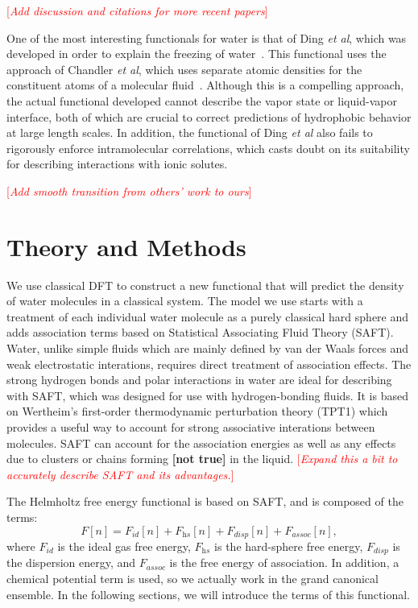 \documentclass[letterpaper,twocolumn,amsmath,amssymb,prb]{revtex4-1}
\newcommand{\red}[1]{{\bf \color{red} #1}}
\newcommand{\fixme}[1]{\red{[#1]}}
\newcommand{\needsworknow}[1]{\textcolor{red}{[\emph{#1}]}}
\begin{document}
\needsworknow{Add discussion and citations for more recent papers}

One of the most interesting functionals for water is that of Ding \emph{et
al}, which was developed in order to explain the freezing of
water~\cite{ding1987}.  This functional uses the approach of Chandler
\emph{et al}, which uses separate atomic densities for the constituent
atoms of a molecular fluid~\cite{chandler1986a, chandler1986b}.  Although
this is a compelling approach, the actual functional developed cannot
describe the vapor state or liquid-vapor interface, both of which are
crucial to correct predictions of hydrophobic behavior at large length
scales.  In addition, the functional of Ding \emph{et al} also fails to
rigorously enforce intramolecular correlations, which casts doubt on its
suitability for describing interactions with ionic solutes.

\needsworknow{Add smooth transition from others' work to ours}

\section{Theory and Methods}
We use classical DFT to construct a new functional that will predict
the density of water molecules in a classical system.  The model we use
starts with a treatment of each individual water molecule as a purely
classical hard sphere and adds association terms based on Statistical 
Associating Fluid Theory (SAFT). Water, unlike simple
fluids which are mainly defined by van der Waals forces and weak electrostatic
interations, requires direct treatment of association effects. The strong 
hydrogen bonds and polar
interactions in water are ideal for describing with SAFT, which was designed for
use with hydrogen-bonding fluids. It is based on Wertheim's first-order
thermodynamic perturbation theory (TPT1)
\cite{wertheim1984fluidsI,wertheim1984fluidsII,wertheim1986fluidsIII,
wertheim1986fluidsIV} which provides a useful way to account for strong
associative interations between molecules. SAFT can account for the association energies
as well as any effects due to clusters or chains forming \fixme{not true}
in the liquid\cite{muller2001molecular}.  \needsworknow{Expand this a
  bit to accurately describe SAFT and its advantages.}

The Helmholtz free energy functional is based on SAFT,
and is composed of the terms:
\begin{equation}
  F[n] = F_\textit{id}[n] + F_\textit{hs}[n]  +
F_\textit{disp}[n]+ F_\textit{assoc}[n],
\end{equation}
where $F_\textit{id}$ is the ideal gas free energy, $F_\textit{hs}$ is
the hard-sphere free energy, $F_\textit{disp}$ is the dispersion energy,
and $F_\textit{assoc}$ is the free energy of association.  In
addition, a chemical potential term is used, so we actually work in
the grand canonical ensemble.  In the following sections, we will
introduce the terms of this functional.
\end{document}
